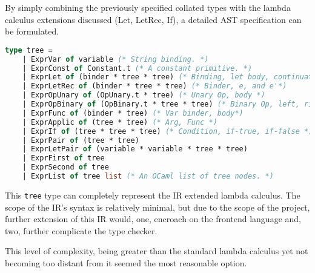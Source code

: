 \documentclass{l4proj}
\begin{document}
By simply combining the previously specified collated types with the lambda calculus extensions discussed (Let, LetRec, If), a detailed AST specification can be formulated.

\clearpage
\begin{lstlisting}[language=Caml, breaklines=false, label=ir-ast, caption=The Abstract Syntax for PyFunc's IR written in OCaml.]
type tree = 
    | ExprVar of variable (* String binding. *)
    | ExprConst of Constant.t (* A constant primitive. *)
    | ExprLet of (binder * tree * tree) (* Binding, let body, continuation. *)
    | ExprLetRec of (binder * tree * tree) (* Binder, e, and e'*)
    | ExprOpUnary of (OpUnary.t * tree) (* Unary Op, body *)
    | ExprOpBinary of (OpBinary.t * tree * tree) (* Binary Op, left, right *)
    | ExprFunc of (binder * tree) (* Var binder, body*)
    | ExprApplic of (tree * tree) (* Arg, Func *)
    | ExprIf of (tree * tree * tree) (* Condition, if-true, if-false *)
    | ExprPair of (tree * tree)
    | ExprLetPair of (variable * variable * tree * tree)
    | ExprFirst of tree
    | ExprSecond of tree
    | ExprList of tree list (* An OCaml list of tree nodes. *)
\end{lstlisting}


This \texttt{tree} type can completely represent the IR extended lambda calculus. 
The scope of the IR's syntax is relatively minimal, but due to the scope of the project, further extension of this IR would, one, encroach on the frontend language and, two, further complicate the type checker.

This level of complexity, being greater than the standard lambda calculus yet not becoming too distant from it seemed the most reasonable option.
\end{document}
